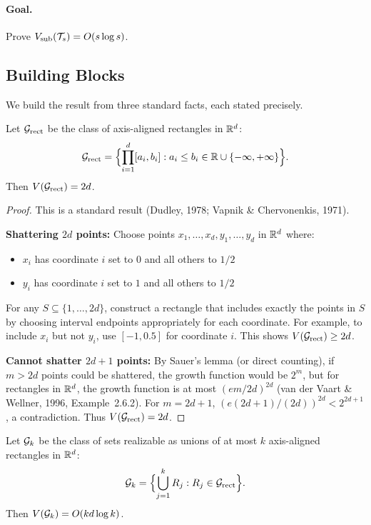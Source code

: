 \documentclass[12pt]{article}
\begin{document}
\paragraph{Goal.}
Prove $V_{\text{sub}}(\mathcal{T}_s) = O(s \log s)$.

\subsection{Building Blocks}

We build the result from three standard facts, each stated precisely.

\begin{lemma}
\label{lem:vc-rect-app}
Let $\mathcal{G}_{\text{rect}}$ be the class of axis-aligned rectangles in $\mathbb{R}^d$:
\[
\mathcal{G}_{\text{rect}} = \Bigl\{ \prod_{i=1}^d [a_i, b_i] : a_i \le b_i \in \mathbb{R} \cup \{-\infty, +\infty\} \Bigr\}.
\]
Then $V(\mathcal{G}_{\text{rect}}) = 2d$.
\end{lemma}

\begin{proof}
This is a standard result (Dudley, 1978; Vapnik \& Chervonenkis, 1971).

\textbf{Shattering $2d$ points:} Choose points $x_1, \ldots, x_d, y_1, \ldots, y_d$ in $\mathbb{R}^d$ where:
\begin{itemize}
\item $x_i$ has coordinate $i$ set to $0$ and all others to $1/2$
\item $y_i$ has coordinate $i$ set to $1$ and all others to $1/2$
\end{itemize}
For any $S \subseteq \{1,\ldots,2d\}$, construct a rectangle that includes exactly the points in $S$ by choosing interval endpoints appropriately for each coordinate. For example, to include $x_i$ but not $y_i$, use $[-1, 0.5]$ for coordinate $i$. This shows $V(\mathcal{G}_{\text{rect}}) \ge 2d$.

\textbf{Cannot shatter $2d+1$ points:} By Sauer's lemma (or direct counting), if $m > 2d$ points could be shattered, the growth function would be $2^m$, but for rectangles in $\mathbb{R}^d$, the growth function is at most $(em/2d)^{2d}$ (van der Vaart \& Wellner, 1996, Example~2.6.2). For $m = 2d+1$, $(e(2d+1)/(2d))^{2d} < 2^{2d+1}$, a contradiction. Thus $V(\mathcal{G}_{\text{rect}}) = 2d$.
\end{proof}

\begin{lemma}
\label{lem:vc-union-app}
Let $\mathcal{G}_k$ be the class of sets realizable as unions of at most $k$ axis-aligned rectangles in $\mathbb{R}^d$:
\[
\mathcal{G}_k = \Bigl\{ \bigcup_{j=1}^k R_j : R_j \in \mathcal{G}_{\text{rect}} \Bigr\}.
\]
Then $V(\mathcal{G}_k) = O(kd \log k)$.
\end{lemma}
\end{document}
